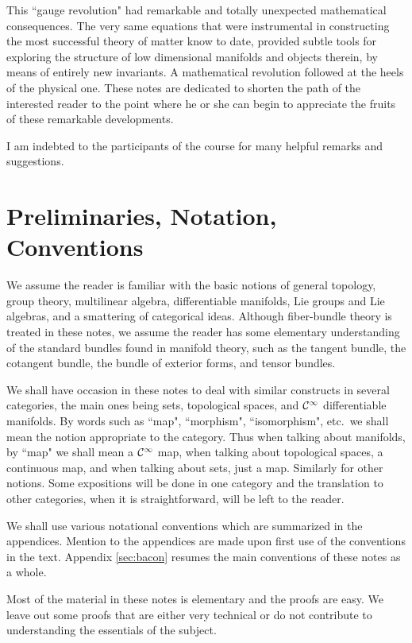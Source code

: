 \documentclass[12pt,titlepage]{article}
\def\cC{{\cal C}}
\begin{document}
This ``gauge revolution" had remarkable and totally unexpected
mathematical consequences. The very same equations that were
instrumental in constructing the most successful theory of matter know
to date, provided subtle tools for exploring the structure of low
dimensional manifolds and objects therein, by means of entirely new
invariants. A mathematical revolution followed at the heels of the
physical one. These notes are dedicated to shorten the path of the
interested reader to the point where he or she can begin to appreciate
the fruits of these remarkable developments.

I am indebted to the participants of the course for many helpful remarks
and suggestions.



\section{Preliminaries, Notation, Conventions}\label{sec:prelim}

We assume the reader is familiar with the basic notions of general
topology, group theory, multilinear algebra, differentiable manifolds,
Lie groups and Lie algebras, and a smattering of categorical ideas.
Although fiber-bundle theory is treated in these notes, we assume the
reader has some elementary understanding of the standard bundles found
in manifold theory, such as the tangent bundle, the cotangent bundle,
the bundle of exterior forms, and tensor bundles.

We shall have occasion in these notes to deal with similar constructs in
several categories, the main ones being sets, topological spaces, and
\(\cC^\infty\) differentiable manifolds. By words such as ``map",
``morphism", ``isomorphism", etc.\  we shall mean the 
notion appropriate to the
category. Thus when talking about manifolds, by ``map" we shall mean a
\(\cC^\infty\) map, when talking about topological spaces, a continuous
map, and when talking about sets, just a map. Similarly for other
notions. Some expositions will be done in one category and the
translation to other categories, when it is straightforward, will be
left to the reader.

We shall use various notational conventions which are summarized in the
appendices. Mention to the appendices are made upon first use of the
conventions in the text. Appendix \ref{sec:bacon} resumes the main
conventions of these notes as a whole.

Most of the material in these notes is elementary and the proofs are
easy. We leave out some  proofs that are either very technical or do not
contribute to understanding the essentials of the subject. 
\end{document}
